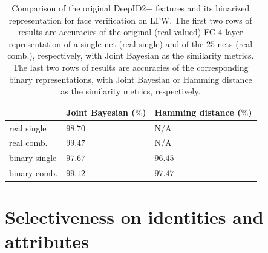 \documentclass[10pt,twocolumn,letterpaper]{article}
\begin{document}
\begin{table}[t]
\caption{Comparison of the original DeepID2+ features and its binarized representation for face verification on LFW. The first two rows of results are accuracies of the original (real-valued) FC-$4$ layer representation of a single net (real single) and of the $25$ nets (real comb.), respectively, with Joint Bayesian as the similarity metrics. The last two rows of results are accuracies of the corresponding binary representations, with Joint Bayesian or Hamming distance as the similarity metrics, respectively.}
\vspace{-0.1in}
\label{tab:sparsity}
\begin{center}
\begin{tabular}{p{60pt}|p{60pt}|p{60pt}}
\toprule
 & Joint Bayesian ($\%$) & Hamming distance ($\%$) \\
\midrule
real single & $98.70$ & N/A \\
real comb. & $99.47$ & N/A \\
binary single & $97.67$ & $96.45$ \\
binary comb. & $99.12$ & $97.47$ \\
\bottomrule
\end{tabular}
\end{center}
\vspace{-0.1in}
\end{table}


\section{Selectiveness on identities and attributes}
\label{sec:selectiveness}
\end{document}

